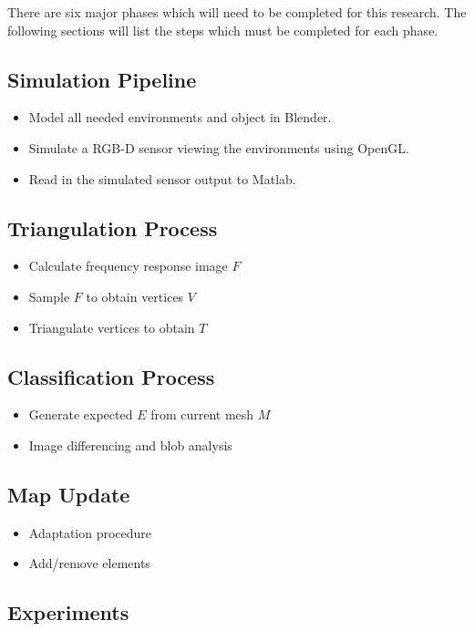 \documentclass[12pt]{article}
\begin{document}
There are six major phases which will need to be completed for this
research. The following sections will list the steps which must be
completed for each phase. 

\subsection{Simulation Pipeline}

\begin{itemize}
\item Model all needed environments and object in Blender.
\item Simulate a RGB-D sensor viewing the environments using OpenGL.
\item Read in the simulated sensor output to Matlab.   
\end{itemize}

\subsection{Triangulation Process}

\begin{itemize}
\item Calculate frequency response image $F$
\item Sample $F$ to obtain vertices $V$
\item Triangulate vertices to obtain $T$
\end{itemize}

\subsection{Classification Process}

\begin{itemize}
\item Generate expected $E$ from current mesh $M$
\item Image differencing and blob analysis
\end{itemize}

\subsection{Map Update}

\begin{itemize}
\item Adaptation procedure
\item Add/remove elements
\end{itemize}

\subsection{Experiments}
\end{document}
